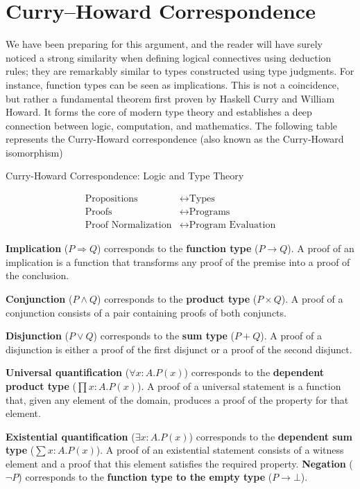 \section{Curry–Howard Correspondence}
We have been preparing for this argument, and the reader will have surely 
noticed a strong similarity when defining logical connectives 
using deduction rules; they are remarkably similar to types constructed 
using type judgments. For instance, function types can be seen as implications.
This is not a coincidence, but rather a fundamental theorem first proven by 
Haskell Curry and William Howard. It forms the core of modern type theory and 
establishes a deep connection between logic, computation, and mathematics.
The following table represents the Curry-Howard correspondence 
(also known as the Curry-Howard isomorphism)
\begin{table}[htbp]
\centering
\caption{Curry-Howard Correspondence: Logic and Type Theory}


\begin{align}
\text{Propositions} &\leftrightarrow \text{Types} \\
\text{Proofs} &\leftrightarrow \text{Programs} \\
\text{Proof Normalization} &\leftrightarrow \text{Program Evaluation}
\end{align}

\textbf{Implication} ($P \Rightarrow Q$) corresponds to the \textbf{function type} ($P \to Q$). 
A proof of an implication is a function that transforms any proof of the premise into a proof of the conclusion.

\textbf{Conjunction} ($P \land Q$) corresponds to the \textbf{product type} ($P \times Q$). 
A proof of a conjunction consists of a pair containing proofs of both conjuncts.

\textbf{Disjunction} ($P \lor Q$) corresponds to the \textbf{sum type} ($P + Q$). 
A proof of a disjunction is either a proof of the first disjunct or a proof of the second disjunct.

\textbf{Universal quantification} ($\forall x:A.P(x)$) corresponds to the \textbf{dependent product type} 
($\prod x:A.P(x)$). 
A proof of a universal statement is a function that, given any element of the domain, 
produces a proof of the property for that element.

\textbf{Existential quantification} ($\exists x:A.P(x)$) corresponds to the \textbf{dependent sum type} 
($\sum x:A.P(x)$). A proof of an existential statement consists of a witness element and a proof 
that this element satisfies the required property.
\textbf{Negation} ($\neg P$) corresponds to the \textbf{function type to the empty type} ($P \to \bot$).


\end{table}
